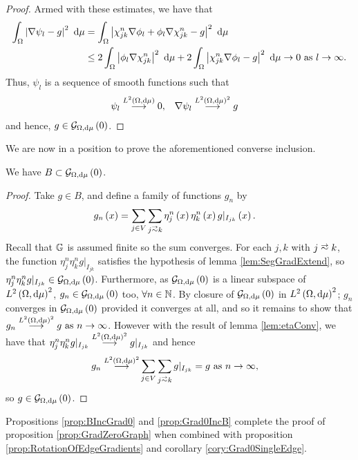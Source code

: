 \begin{proof}
	Armed with these estimates, we have that
	\begin{align*}
		\int_{\Omega}\left\lvert \nabla\psi_l - g \right\rvert^2 \ \mathrm{d}\mu 
		&= \int_{\Omega}\left\lvert \chi_{jk}^n\nabla\phi_l + \phi_l\nabla\chi_{jk}^n - g \right\rvert^2 \ \mathrm{d}\mu \\
		&\leq 2\int_{\Omega}\left\lvert \phi_l\nabla\chi_{jk}^n \right\rvert^2 \ \mathrm{d}\mu + 2\int_{\Omega}\left\lvert \chi_{jk}^n\nabla\phi_l - g \right\rvert^2 \ \mathrm{d}\mu
		\rightarrow0 \ \text{as} \ l \rightarrow\infty.
	\end{align*}
	Thus, $\psi_l$ is a sequence of smooth functions such that
	\begin{align*}
		\psi_l \overset{L^{2}\left( \Omega,\mathrm{d}\mu \right)}{\longrightarrow} 0, &\quad
		\nabla\psi_l \overset{L^{2}\left( \Omega,\mathrm{d}\mu \right)^2}{\longrightarrow} g
	\end{align*}
	and hence, $g\in\mathcal{G}_{ \Omega, \mathrm{d}\mu}\left( 0 \right)$.
\end{proof}

We are now in a position to prove the aforementioned converse inclusion.
\begin{prop} \label{prop:BIncGrad0}
	We have $B \subset \mathcal{G}_{ \Omega, \mathrm{d}\mu}\left( 0 \right)$.
\end{prop}
\begin{proof}
	Take $g\in B$, and define a family of functions $g_n$ by
	\begin{align*}
		g_n\bracs{x} &= \sum_{j\in V}\sum_{j\conLeft k}\eta_j^n\bracs{x}\eta_k^n\bracs{x}g\vert_{I_{jk}}\bracs{x}.
	\end{align*}
	Recall that $\mathbb{G}$ is assumed finite so the sum converges.
	For each $j,k$ with $j\conLeft k$, the function $\eta_j^n\eta_k^n g\vert_{I_{jk}}$ satisfies the hypothesis of lemma \ref{lem:SegGradExtend}, so $\eta_j^n\eta_k^n g\vert_{I_{jk}}\in\mathcal{G}_{ \Omega, \mathrm{d}\mu}\left( 0 \right)$.
	Furthermore, as $\mathcal{G}_{ \Omega, \mathrm{d}\mu}\left( 0 \right)$ is a linear subspace of $L^{2}\left( \Omega,\mathrm{d}\mu \right)^{2}$, $g_n\in\mathcal{G}_{ \Omega, \mathrm{d}\mu}\left( 0 \right)$ too, $\forall n\in\mathbb{N}$.
	By closure of $\mathcal{G}_{ \Omega, \mathrm{d}\mu}\left( 0 \right)$ in $L^{2}\left( \Omega,\mathrm{d}\mu \right)^2$; $g_n$ converges in $\mathcal{G}_{ \Omega, \mathrm{d}\mu}\left( 0 \right)$ provided it converges at all, and so it remains to show that $g_n\overset{L^{2}\left( \Omega,\mathrm{d}\mu \right)^2}{\longrightarrow} g \ \text{as} \ n \rightarrow\infty$.
	However with the result of lemma \ref{lem:etaConv}, we have that $\eta_j^n\eta_k^n g\vert_{I_{jk}}\overset{L^{2}\left( \Omega,\mathrm{d}\mu \right)^2}{\longrightarrow} g\vert_{I_{jk}}$ and hence
	\begin{align*}
		g_n \lconv{\ltwo{\ddom}{\ddmes}^2} &\sum_{j\in V}\sum_{j\conLeft k}g\vert_{I_{jk}} = g \toInfty{n},
	\end{align*}
	so $g\in\mathcal{G}_{ \Omega, \mathrm{d}\mu}\left( 0 \right)$.
\end{proof}
Propositions \ref{prop:BIncGrad0} and \ref{prop:Grad0IncB} complete the proof of proposition \ref{prop:GradZeroGraph} when combined with proposition \ref{prop:RotationOfEdgeGradients} and corollary \ref{cory:Grad0SingleEdge}.

